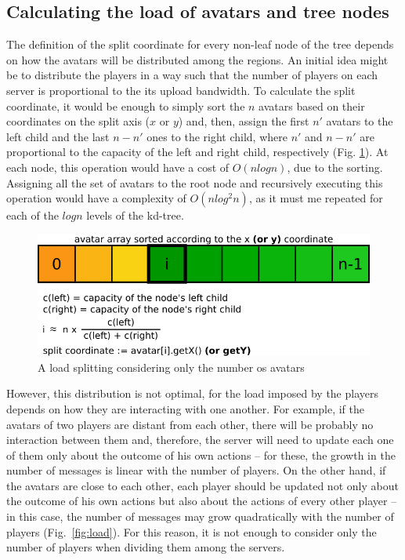 \documentclass[acmjacm]{acmtrans2m}
\newcommand{\figurecaption}{Fig.}
\begin{document}
\subsection{Calculating the load of avatars and tree nodes}

The definition of the split coordinate for every non-leaf node of the tree depends on how the avatars will be distributed among the regions. An initial idea might be to distribute the players in a way such that the number of players on each server is proportional to the its upload bandwidth. To calculate the split coordinate, it would be enough to simply sort the $n$ avatars based on their coordinates on the split axis ($x$ or $y$) and, then, assign the first $n'$ avatars to the left child and the last $n - n'$ ones to the right child, where $n'$ and $n - n'$ are proportional to the capacity of the left and right child, respectively (\figurecaption{} \ref{fig:vector}). At each node, this operation would have a cost of $O(nlogn)$, due to the sorting. Assigning all the set of avatars to the root node and recursively executing this operation would have a complexity of $O(nlog^2n)$, as it must me repeated for each of the $logn$ levels of the kd-tree.

\begin{figure}
  \centering
  \includegraphics[width=0.8\linewidth]{images/vector}
  \caption{A load splitting considering only the number os avatars}
  \label{fig:vector}
\end{figure}

However, this distribution is not optimal, for the load imposed by the players depends on how they are interacting with one another. For example, if the avatars of two players are distant from each other, there will be probably no interaction between them and, therefore, the server will need to update each one of them only about the outcome of his own actions -- for these, the growth in the number of messages is linear with the number of players. On the other hand, if the avatars are close to each other, each player should be updated not only about the outcome of his own actions but also about the actions of every other player -- in this case, the number of messages may grow quadratically with the number of players \mbox{(\figurecaption{} \ref{fig:load})}. For this reason, it is not enough to consider only the number of players when dividing them among the servers.
\end{document}
